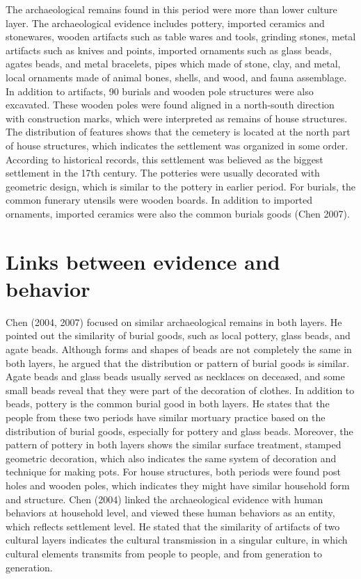 \documentclass[10pt]{article}
\begin{document}
The archaeological remains found in this period were more than lower
culture layer. The archaeological evidence includes pottery, imported
ceramics and stonewares, wooden artifacts such as table wares and tools,
grinding stones, metal artifacts such as knives and points, imported
ornaments such as glass beads, agates beads, and metal bracelets, pipes
which made of stone, clay, and metal, local ornaments made of animal
bones, shells, and wood, and fauna assemblage. In addition to artifacts,
90 burials and wooden pole structures were also excavated. These wooden
poles were found aligned in a north-south direction with construction
marks, which were interpreted as remains of house structures. The
distribution of features shows that the cemetery is located at the north
part of house structures, which indicates the settlement was organized
in some order. According to historical records, this settlement was
believed as the biggest settlement in the 17th century. The potteries
were usually decorated with geometric design, which is similar to the
pottery in earlier period. For burials, the common funerary utensils
were wooden boards. In addition to imported ornaments, imported ceramics
were also the common burials goods (Chen 2007).

\section*{Links between evidence and
behavior}\label{links-between-evidence-and-behavior}

Chen (2004, 2007) focused on similar archaeological remains in both
layers. He pointed out the similarity of burial goods, such as local
pottery, glass beads, and agate beads. Although forms and shapes of
beads are not completely the same in both layers, he argued that the
distribution or pattern of burial goods is similar. Agate beads and
glass beads usually served as necklaces on deceased, and some small
beads reveal that they were part of the decoration of clothes. In
addition to beads, pottery is the common burial good in both layers. He
states that the people from these two periods have similar mortuary
practice based on the distribution of burial goods, especially for
pottery and glass beads. Moreover, the pattern of pottery in both layers
shows the similar surface treatment, stamped geometric decoration, which
also indicates the same system of decoration and technique for making
pots. For house structures, both periods were found post holes and
wooden poles, which indicates they might have similar household form and
structure. Chen (2004) linked the archaeological evidence with human
behaviors at household level, and viewed these human behaviors as an
entity, which reflects settlement level. He stated that the similarity
of artifacts of two cultural layers indicates the cultural transmission
in a singular culture, in which cultural elements transmits from people
to people, and from generation to generation.
\end{document}
